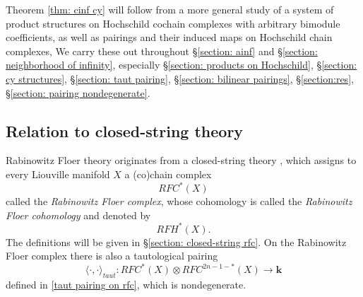 \documentclass[11pt]{amsproc}
\def\K{{\mathbf{k}}}
\theoremstyle{remark}
\numberwithin{equation}{section}
\begin{document}
Theorem \ref{thm: cinf cy} will follow from a more general study of a system of product structures on Hochschild cochain complexes with arbitrary bimodule coefficients,
as well as pairings and their induced maps on Hochschild chain complexes,
We carry these out throughout \S\ref{section: ainf} and \S\ref{section: neighborhood of infinity},
especially \S\ref{section: products on Hochschild}, \S\ref{section: cy structures}, \S\ref{section: taut pairing}, \S\ref{section: bilinear pairings}, \S\ref{section:res}, \S\ref{section: pairing nondegenerate}.

\subsection{Relation to closed-string theory}

Rabinowitz Floer theory originates from a closed-string theory \cite{CF, CFO},
which assigns to every Liouville manifold $X$ a (co)chain complex
\begin{equation}
RFC^{*}(X)
\end{equation}
called the {\it Rabinowitz Floer complex},
whose cohomology is called the {\it Rabinowitz Floer cohomology} and denoted by
\begin{equation}
RFH^{*}(X).
\end{equation}
The definitions will be given in \S\ref{section: closed-string rfc}.
On the Rabinowitz Floer complex there is also a tautological pairing 
\begin{equation}\label{pairing on rfc}
\langle \cdot, \cdot \rangle_{taut}: RFC^{*}(X) \otimes RFC^{2n-1-*}(X) \to \K
\end{equation}
defined in \eqref{taut pairing on rfc},
which is nondegenerate.
\end{document}
